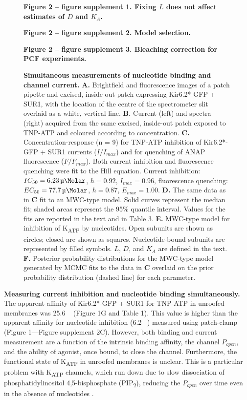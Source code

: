 \documentclass[10pt,lineno, doublespacing]{elife}
\begin{document}
\begin{figure}\ContinuedFloat
\begin{fullwidth}
\caption{
\textbf{Simultaneous measurements of nucleotide binding and channel current.}
\textbf{A.}
Brightfield and fluorescence images of a patch pipette and excised, inside out patch expressing Kir6.2*-GFP + SUR1, with the location of the centre of the spectrometer slit overlaid as a white, vertical line.
\textbf{B.}
Current (left) and spectra (right) acquired from the same excised, inside-out patch exposed to TNP-ATP and coloured according to concentration.
\textbf{C.}
Concentration-response (n = 9) for TNP-ATP inhibition of Kir6.2*-GFP + SUR1 currents ($I/I_{max}$) and for quenching of ANAP fluorescence ($F/F_{max}$).
Both current inhibition and fluorescence quenching were fit to the Hill equation.
Current inhibition: $IC_{50} = \SI{6.23}{\micro\Molar}$, $h = 0.92$, $I_{max} = 0.96$, fluorescence quenching: $EC_{50} = \SI{77.7}{\micro\Molar}$, $h = 0.87$, $E_{max} = 1.00$.
\textbf{D.}
The same data as in \textbf{C} fit to an MWC-type model.
Solid curves represent the median fit; shaded areas represent the 95\% quantile interval.
Values for the fits are reported in the text and in Table 3.
\textbf{E.}
MWC-type model for inhibition of K\textsubscript{ATP} by nucleotides.
Open subunits are shown as circles; closed are shown as squares.
Nucleotide-bound subunits are represented by filled symbols. $L$, $D$, and $K_A$ are defined in the text.
\textbf{F.}
Posterior probability distributions for the MWC-type model generated by MCMC fits to the data in \textbf{C} overlaid on the prior probability distribution (dashed line) for each parameter.
}
\raggedright
\textbf{\small Figure 2 -- figure supplement 1. Fixing $L$ does not affect estimates of $D$ and $K_A$.}

\textbf{\small Figure 2 -- figure supplement 2. Model selection.}

\textbf{\small Figure 2 -- figure supplement 3. Bleaching correction for PCF experiments.}
\end{fullwidth}
\end{figure}

\textbf{Measuring current inhibition and nucleotide binding simultaneously.}
The apparent affinity of Kir6.2*-GFP + SUR1 for TNP-ATP in unroofed membranes was 25.6 \si{\micro\Molar} (Figure 1G and Table 1).
This value is higher than the apparent affinity for nucleotide inhibition (6.2 \si{\micro\Molar}) measured using patch-clamp (Figure 1—Figure supplement 2C).
However, both binding and current measurement are a function of the intrinsic binding affinity, the channel $P_{open}$, and the ability of agonist, once bound, to close the channel.
Furthermore, the functional state of K\textsubscript{ATP} in unroofed membranes is unclear. This is a particular problem with K\textsubscript{ATP} channels, which run down due to slow dissociation of phosphatidylinositol 4,5-bisphosphate (PIP\textsubscript{2}), reducing the $P_{open}$ over time even in the absence of nucleotides \citep{RN51}.
\end{document}
